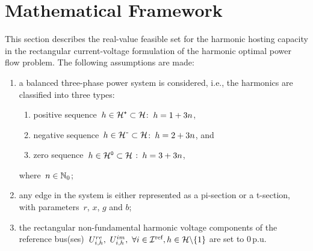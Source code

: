 \documentclass[journal]{IEEEtran}
\begin{document}
\section{Mathematical Framework}
\label{sec:mathematical_framework}

This section describes the real-value feasible set for the harmonic hosting capacity in the rectangular current-voltage formulation of the harmonic optimal power flow problem. The following assumptions are made:
\begin{enumerate}
    \item a balanced three-phase power system is considered, i.e., the harmonics are classified into three types:
    \begin{enumerate}
        \item positive sequence~$h \in \mathcal{H}^{\texttt{+}} \subset \mathcal{H}$:~$h=1+3n$,
        \item negative sequence~$h \in \mathcal{H}^{\texttt{-}} \subset \mathcal{H}$:~$h=2+3n$, and
        \item zero sequence~$h \in \mathcal{H}^{\texttt{0}} \subset \mathcal{H}$ :~$h=3+3n$,
    \end{enumerate}
    where~$n \in \mathbb{N}_{0}$;
    \item any edge in the system is either represented as a pi-section or a t-section, with parameters~$r$, $x$, $g$ and $b$;
    \item the rectangular non-fundamental harmonic voltage components of the reference bus(ses)~$U^{re}_{i,h},~U^{im}_{i,h},~\forall i \in \mathcal{I}^{\text{ref}}, h \in \mathcal{H} \backslash \{1\}$ are set to 0\,p.u.
\end{enumerate}


\end{document}
